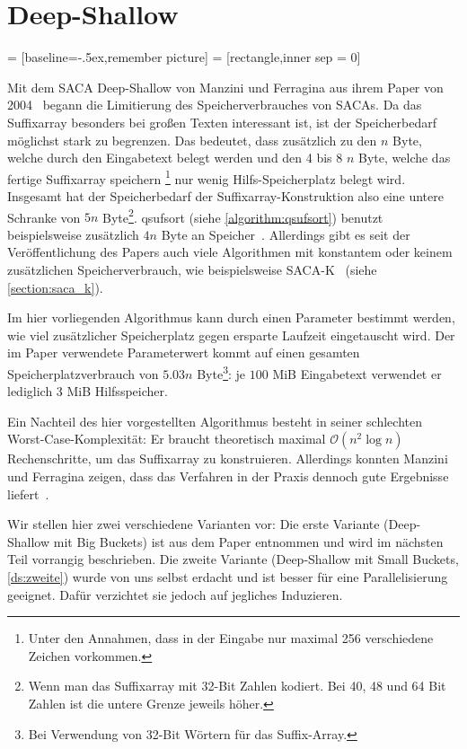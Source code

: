 \section{Deep-Shallow}
 = [baseline=-.5ex,remember picture]
 = [rectangle,inner sep = 0]

Mit dem SACA  Deep-Shallow von Manzini und Ferragina aus ihrem
Paper von 2004~\cite{saca:4} begann die Limitierung des Speicherverbrauches von SACAs.
Da das Suffixarray besonders bei großen Texten interessant ist, ist der Speicherbedarf möglichst stark zu begrenzen.
Das bedeutet, dass zusätzlich zu den $n$ Byte, welche durch den Eingabetext belegt werden
und den 4 bis 8 $n$ Byte, welche das fertige Suffixarray speichern
\footnote{Unter den Annahmen, dass in der Eingabe nur maximal 256 verschiedene Zeichen vorkommen.}
nur wenig Hilfs-Speicherplatz belegt wird.
Insgesamt hat der Speicherbedarf der Suffixarray-Konstruktion also eine untere Schranke von
$5n$ Byte\footnote{Wenn man das Suffixarray mit 32-Bit Zahlen kodiert.
Bei 40, 48 und 64 Bit Zahlen ist die untere Grenze jeweils höher.}.
qsufsort (siehe \cref{algorithm:qsufsort})
benutzt beispielsweise zusätzlich $4n$ Byte an Speicher~\cite{saca:4}.
Allerdings gibt es seit der Veröffentlichung des Papers auch viele Algorithmen mit
konstantem oder keinem zusätzlichen Speicherverbrauch,
wie beispielsweise SACA-K~\cite{saca:7} (siehe \cref{section:saca_k}).

Im hier vorliegenden Algorithmus kann durch einen Parameter bestimmt werden, wie viel
zusätzlicher Speicherplatz gegen ersparte Laufzeit eingetauscht wird.
Der im Paper verwendete Parameterwert kommt auf einen gesamten Speicherplatzverbrauch
von $5.03n$ Byte\footnote{Bei Verwendung von 32-Bit Wörtern für das Suffix-Array.}:
je $100$ MiB Eingabetext verwendet er lediglich 3 MiB Hilfsspeicher.

Ein Nachteil des hier vorgestellten Algorithmus besteht in seiner schlechten Worst-Case-Komplexität:
Er braucht theoretisch maximal $\mathcal O(n^2 \log n)$ Rechenschritte, um das Suffixarray zu konstruieren.
Allerdings konnten Manzini und Ferragina zeigen, dass das Verfahren in der Praxis dennoch
gute Ergebnisse liefert~\cite{saca:4}.

Wir stellen hier zwei verschiedene Varianten vor: Die erste Variante (Deep-Shallow mit Big Buckets)
ist aus dem Paper entnommen und wird im nächsten Teil vorrangig beschrieben.
Die zweite Variante (Deep-Shallow mit Small Buckets, \cref{ds:zweite}) wurde von uns selbst erdacht und
ist besser für eine Parallelisierung geeignet. Dafür verzichtet sie jedoch auf jegliches Induzieren. 

